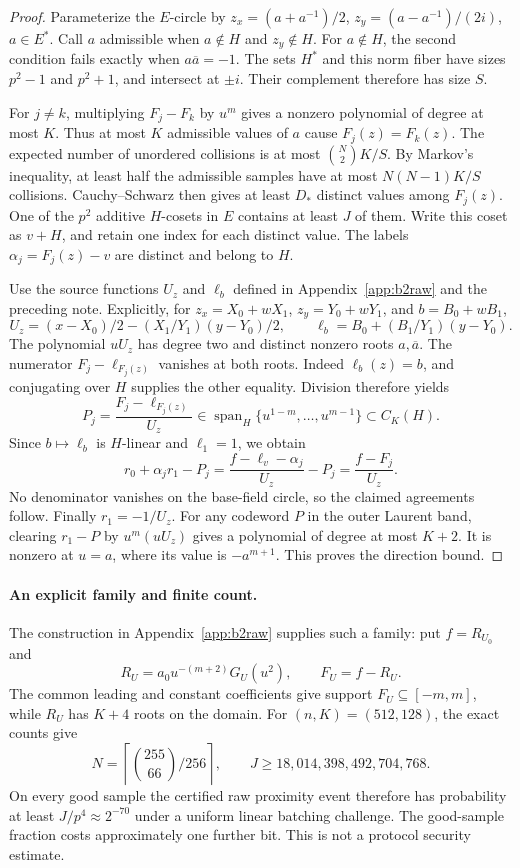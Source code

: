\documentclass[11pt,letterpaper]{article}
\theoremstyle{definition}
\theoremstyle{remark}
\begin{document}
\begin{proof}
Parameterize the $E$-circle by
$z_x=(a+a^{-1})/2$, $z_y=(a-a^{-1})/(2i)$, $a\in E^*$.
Call $a$ admissible when $a\notin H$ and $z_y\notin H$.
For $a\notin H$, the second condition fails exactly when
$a\overline a=-1$. The sets $H^*$ and this norm fiber have sizes
$p^2-1$ and $p^2+1$, and intersect at $\pm i$. Their complement
therefore has size $S$.

For $j\ne k$, multiplying $F_j-F_k$ by $u^m$ gives a nonzero
polynomial of degree at most $K$. Thus at most $K$ admissible values
of $a$ cause $F_j(z)=F_k(z)$. The expected number of unordered
collisions is at most $\binom N2K/S$. By Markov's inequality,
at least half the admissible samples have at most $N(N-1)K/S$
collisions. Cauchy--Schwarz then gives at least $D_*$ distinct values
among $F_j(z)$. One of the $p^2$ additive $H$-cosets in $E$ contains
at least $J$ of them. Write this coset as $v+H$, and retain one index
for each distinct value. The labels $\alpha_j=F_j(z)-v$ are distinct
and belong to $H$.

Use the source functions $U_z$ and $\ell_b$ defined in
Appendix~\ref{app:b2raw} and the preceding note. Explicitly, for
$z_x=X_0+wX_1$, $z_y=Y_0+wY_1$, and $b=B_0+wB_1$,
\[
 U_z=(x-X_0)/2-(X_1/Y_1)(y-Y_0)/2,\qquad
 \ell_b=B_0+(B_1/Y_1)(y-Y_0).
\]
The polynomial $uU_z$ has degree two and distinct nonzero roots
$a,\overline a$. The numerator $F_j-\ell_{F_j(z)}$ vanishes at
both roots. Indeed $\ell_b(z)=b$, and conjugating over $H$ supplies
the other equality. Division therefore yields
\[
 P_j=\frac{F_j-\ell_{F_j(z)}}{U_z}
 \in\operatorname{span}_H\{u^{1-m},\ldots,u^{m-1}\}\subset C_K(H).
\]
Since $b\mapsto\ell_b$ is $H$-linear and $\ell_1=1$, we obtain
\[
 r_0+\alpha_j r_1-P_j
 =\frac{f-\ell_v-\alpha_j}{U_z}-P_j
 =\frac{f-F_j}{U_z}.
\]
No denominator vanishes on the base-field circle, so the claimed
agreements follow. Finally $r_1=-1/U_z$. For any codeword $P$ in
the outer Laurent band, clearing $r_1-P$ by $u^m(uU_z)$ gives a
polynomial of degree at most $K+2$. It is nonzero at $u=a$, where
its value is $-a^{m+1}$. This proves the direction bound.
\end{proof}

\paragraph{An explicit family and finite count.}
The construction in Appendix~\ref{app:b2raw} supplies such a family:
put $f=R_{U_0}$ and
\[
 R_U=a_0u^{-(m+2)}G_U(u^2),\qquad F_U=f-R_U.
\]
The common leading and constant coefficients give support
$F_U\subseteq[-m,m]$, while $R_U$ has $K+4$ roots on the domain.
For $(n,K)=(512,128)$, the exact counts give
\[
 N=\left\lceil\binom{255}{66}/256\right\rceil,
 \qquad J\ge18{,}014{,}398{,}492{,}704{,}768.
\]
On every good sample the certified raw proximity event therefore has
probability at least $J/p^4\approx2^{-70}$ under a uniform linear
batching challenge. The good-sample fraction costs approximately one
further bit. This is not a protocol security estimate.
\end{document}

